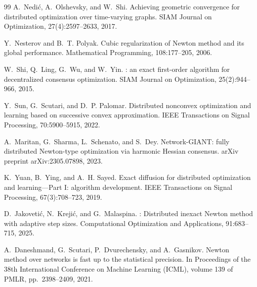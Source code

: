 \documentclass[review,onefignum,onetabnum]{siamart171218}
\begin{document}
\begin{thebibliography}{99}
		A.~Nedi{\'c}, A.~Olshevsky, and W.~Shi.
		\newblock Achieving geometric convergence for distributed optimization over time-varying graphs.
		\newblock SIAM Journal on Optimization, 27(4):2597--2633, 2017.
		
		Y.~Nesterov and B.~T. Polyak.
		\newblock Cubic regularization of {N}ewton method and its global performance.
		\newblock Mathematical Programming, 108:177--205, 2006.
		
		W.~Shi, Q.~Ling, G.~Wu, and W.~Yin.
		: an exact first-order algorithm for decentralized consensus optimization.
		\newblock SIAM Journal on Optimization, 25(2):944--966, 2015.
		
		Y.~Sun, G.~Scutari, and D.~P. Palomar.
		\newblock Distributed nonconvex optimization and learning based on successive convex approximation.
		\newblock IEEE Transactions on Signal Processing, 70:5900--5915, 2022.
		
		A.~Maritan, G.~Sharma, L.~Schenato, and S.~Dey.
		\newblock Network-{GIANT}: fully distributed {N}ewton-type optimization via harmonic {H}essian consensus.
		\newblock arXiv preprint arXiv:2305.07898, 2023.
		
		K.~Yuan, B.~Ying, and A.~H. Sayed.
		\newblock Exact diffusion for distributed optimization and learning---Part {I}: algorithm development.
		\newblock IEEE Transactions on Signal Processing, 67(3):708--723, 2019.
		
		
		D.~Jakoveti{\'c}, N.~Kreji{\'c}, and G.~Malaspina.
		: Distributed inexact {N}ewton method with adaptive step sizes.
		\newblock Computational Optimization and Applications, 91:683--715, 2025.

		A.~Daneshmand, G.~Scutari, P.~Dvurechensky, and A.~Gasnikov.
		\newblock Newton method over networks is fast up to the statistical precision.
		\newblock In Proceedings of the 38th International Conference on Machine Learning (ICML), volume 139 of PMLR, pp.~2398--2409, 2021.
		

\end{thebibliography}
\end{document}
